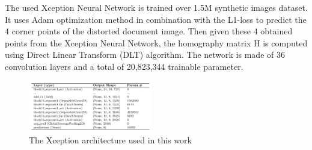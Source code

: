 \documentclass[10pt,twocolumn,letterpaper]{article}
\begin{document}

The used Xception Neural Network is trained over 1.5M synthetic images
dataset. It uses Adam optimization method in combination with the
L1-loss to predict the 4 corner points of the distorted document
image. Then given these 4 obtained points from the Xception Neural
Network, the homography matrix H is computed using Direct Linear
Transform (DLT) algorithm. The network is made of 36 convolution
layers and a total of 20,823,344 trainable parameter.

\begin{figure}[h]
  \centering
  \includegraphics[width=0.48\textwidth]{images/xception-architecture.png}
  \caption{The Xception architecture used in this work}
  \label{fig:xception-architecture}
\end{figure}
\end{document}
